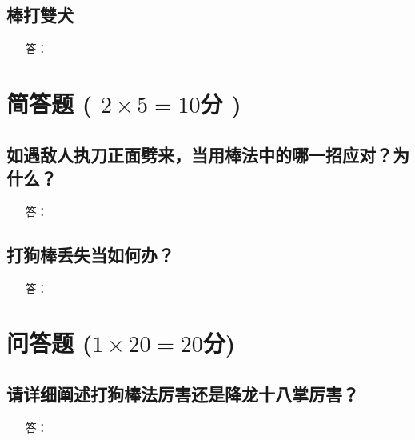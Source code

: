 \documentclass[a3]{swfcexam}
\begin{document}
\subsection*{棒打雙犬}
\begin{itemize}
\item[答：] 
\end{itemize}

\vspace{20em}

\vfill%
\section{简答题 ( $2\times 5=10$分 )}

\subsection{如遇敌人执刀正面劈来，当用棒法中的哪一招应对？为什么？}
\begin{itemize}
\item[答：] 
\end{itemize}

\vspace{20em}
\vfill%
\subsection{打狗棒丢失当如何办？}
\begin{itemize}
\item[答：] 
\end{itemize}

\vspace{20em}
\vfill%
\section{问答题 ($1\times{}20=20$分)}
\subsection{请详细阐述打狗棒法厉害还是降龙十八掌厉害？}
\begin{itemize}
\item[答：] 
\end{itemize}

\vspace{20em}
\end{document}
